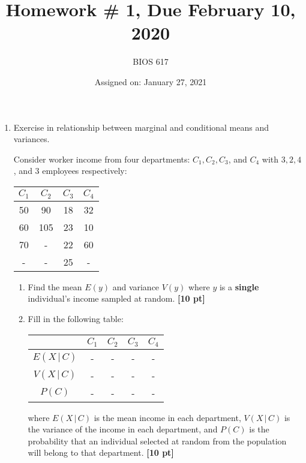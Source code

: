 \documentclass[12pt]{article}
\def\given{\, | \,}
\begin{document}
\title{Homework \# 1, Due February 10, 2020}
\author{BIOS 617}
\date{Assigned on: January 27, 2021}

\maketitle

\begin{enumerate}
\setlength{\itemsep}{15pt}%
\setlength{\parskip}{15pt}%

\item Exercise in relationship between marginal and conditional means and variances.

Consider worker income from four departments: $C_1, C_2, C_3$, and $C_4$ with $3, 2, 4$, and $3$ employees respectively:

\begin{table}[!th]
\centering
\begin{tabular}{| c c c c |}
\hline
$C_1$ & $C_2$ & $C_3$ & $C_4$ \\ \hline
50 & 90 & 18 & 32 \\
60 & 105 & 23 & 10 \\
70 & - & 22 & 60 \\
- & - & 25 & - \\ \hline
\end{tabular}
\end{table}

	\begin{enumerate}
		\setlength{\itemsep}{15pt}%
		\setlength{\parskip}{15pt}%

		\item Find the mean $E(y)$ and variance $V(y)$ where $y$ is a {\bf single} individual's income sampled at random. {\bf [10 pt]}
		\item Fill in the following table:
		\begin{table}[!th]
		\centering
		\begin{tabular}{| c | c c c c |} \hline
		& $C_1$ & $C_2$ & $C_3$ & $C_4$ \\ \hline
		$E(X \given C)$ & - & - & - & - \\
		$V(X \given C)$ & - & - & - & - \\
		$P(C)$ & - & - & - & - \\ \hline
		\end{tabular}
		\end{table}

		where $E ( X \given C )$ is the mean income in each department, $V ( X \given C )$ is the variance of the income in each department, and $P ( C )$ is the probability that an individual selected at random from the population will belong to that department. {\bf [10 pt]}


\end{enumerate}
\end{enumerate}
\end{document}
